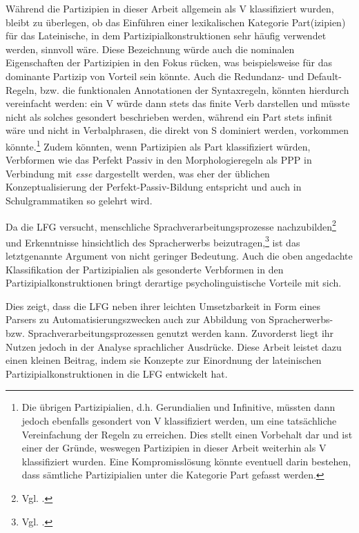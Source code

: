 \documentclass[12pt,a4paper]{article}
\begin{document}
Während die Partizipien in dieser Arbeit allgemein als V klassifiziert wurden, bleibt zu überlegen, ob das Einführen einer lexikalischen Kategorie Part(izipien) für das Lateinische, in dem Partizipialkonstruktionen sehr häufig verwendet werden, sinnvoll wäre. Diese Bezeichnung würde auch die nominalen Eigenschaften der Partizipien in den Fokus rücken, was beispielsweise für das dominante Partizip von Vorteil sein könnte.
Auch die Redundanz- und Default-Regeln, bzw. die funktionalen Annotationen der Syntaxregeln, könnten hierdurch vereinfacht werden: ein V würde dann stets das finite Verb darstellen und müsste nicht als solches gesondert beschrieben werden, während ein Part stets infinit wäre und nicht in Verbalphrasen, die direkt von S dominiert werden, vorkommen könnte.\footnote{Die übrigen Partizipialien, d.h. Gerundialien und Infinitive, müssten dann jedoch ebenfalls gesondert von V klassifiziert werden, um eine tatsächliche Vereinfachung der Regeln zu erreichen. Dies stellt einen Vorbehalt dar und ist einer der Gründe, weswegen Partizipien in dieser Arbeit weiterhin als V klassifiziert wurden. Eine Kompromisslösung könnte eventuell darin bestehen, dass sämtliche Partizipialien unter die Kategorie Part gefasst werden.} Zudem könnten, wenn Partizipien als Part klassifiziert würden, Verbformen wie das Perfekt Passiv in den Morphologieregeln als PPP in Verbindung mit \textit{esse} dargestellt werden, was eher der üblichen Konzeptualisierung der Perfekt-Passiv-Bildung entspricht und auch in Schulgrammatiken so gelehrt wird. 

Da die LFG versucht, menschliche Sprachverarbeitungsprozesse nachzubilden\footnote{Vgl. \cite[12; 60]{Rohrer}.} und Erkenntnisse hinsichtlich des Spracherwerbs beizutragen,\footnote{Vgl. \cite[21]{DAZ}.} ist das letztgenannte Argument von nicht geringer Bedeutung. Auch die oben angedachte Klassifikation der Partizipialien als gesonderte Verbformen in den Partizipialkonstruktionen bringt derartige psycholinguistische Vorteile mit sich.

Dies zeigt, dass die LFG neben ihrer leichten Umsetzbarkeit in Form eines Parsers zu Automatisierungszwecken auch zur Abbildung von Spracherwerbs- bzw. Sprachverarbeitungsprozessen genutzt werden kann. Zuvorderst liegt ihr Nutzen jedoch in der Analyse sprachlicher Ausdrücke. Diese Arbeit leistet dazu einen kleinen Beitrag, indem sie Konzepte zur Einordnung der lateinischen Partizipialkonstruktionen in die LFG entwickelt hat.

%
\pagebreak
\printbibliography
\end{document}
